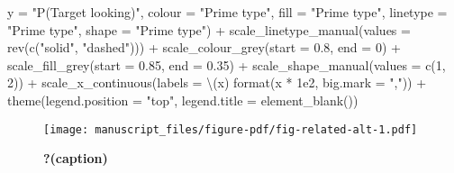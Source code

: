 \documentclass[
  letterpaper,
  DIV=11,
  numbers=noendperiod]{scrartcl}
\newenvironment{Shaded}{\begin{snugshade}}{\end{snugshade}}
\newcommand{\AttributeTok}[1]{\textcolor[rgb]{0.40,0.45,0.13}{#1}}
\newcommand{\DecValTok}[1]{\textcolor[rgb]{0.68,0.00,0.00}{#1}}
\newcommand{\FloatTok}[1]{\textcolor[rgb]{0.68,0.00,0.00}{#1}}
\newcommand{\FunctionTok}[1]{\textcolor[rgb]{0.28,0.35,0.67}{#1}}
\newcommand{\NormalTok}[1]{\textcolor[rgb]{0.00,0.23,0.31}{#1}}
\newcommand{\SpecialCharTok}[1]{\textcolor[rgb]{0.37,0.37,0.37}{#1}}
\newcommand{\StringTok}[1]{\textcolor[rgb]{0.13,0.47,0.30}{#1}}
\begin{document}
\begin{Shaded}
\begin{Highlighting}[]
         \AttributeTok{y =} \StringTok{"P(Target looking)"}\NormalTok{,}
         \AttributeTok{colour =} \StringTok{"Prime type"}\NormalTok{,}
         \AttributeTok{fill =} \StringTok{"Prime type"}\NormalTok{,}
         \AttributeTok{linetype =} \StringTok{"Prime type"}\NormalTok{,}
         \AttributeTok{shape =} \StringTok{"Prime type"}\NormalTok{) }\SpecialCharTok{+}
    \FunctionTok{scale\_linetype\_manual}\NormalTok{(}\AttributeTok{values =} \FunctionTok{rev}\NormalTok{(}\FunctionTok{c}\NormalTok{(}\StringTok{"solid"}\NormalTok{, }\StringTok{"dashed"}\NormalTok{))) }\SpecialCharTok{+}
    \FunctionTok{scale\_colour\_grey}\NormalTok{(}\AttributeTok{start =} \FloatTok{0.8}\NormalTok{, }\AttributeTok{end =} \DecValTok{0}\NormalTok{) }\SpecialCharTok{+}
    \FunctionTok{scale\_fill\_grey}\NormalTok{(}\AttributeTok{start =} \FloatTok{0.85}\NormalTok{, }\AttributeTok{end =} \FloatTok{0.35}\NormalTok{) }\SpecialCharTok{+}
    \FunctionTok{scale\_shape\_manual}\NormalTok{(}\AttributeTok{values =} \FunctionTok{c}\NormalTok{(}\DecValTok{1}\NormalTok{, }\DecValTok{2}\NormalTok{)) }\SpecialCharTok{+}
    \FunctionTok{scale\_x\_continuous}\NormalTok{(}\AttributeTok{labels =}\NormalTok{ \textbackslash{}(x) }\FunctionTok{format}\NormalTok{(x }\SpecialCharTok{*} \FloatTok{1e2}\NormalTok{, }\AttributeTok{big.mark =} \StringTok{","}\NormalTok{)) }\SpecialCharTok{+}
    \FunctionTok{theme}\NormalTok{(}\AttributeTok{legend.position =} \StringTok{"top"}\NormalTok{,}
          \AttributeTok{legend.title =} \FunctionTok{element\_blank}\NormalTok{())}
\end{Highlighting}
\end{Shaded}

\begin{figure}[H]

{\centering \texttt{[image: manuscript\_files/figure-pdf/fig-related-alt-1.pdf]}

}

\caption{\label{fig-related-alt}\textbf{?(caption)}}

\end{figure}
\end{document}
